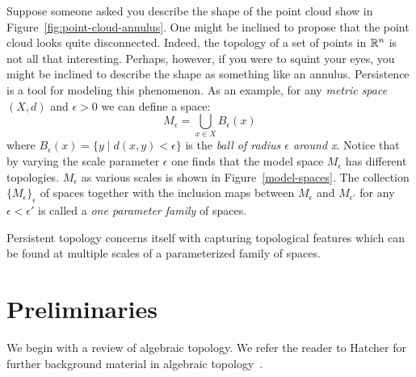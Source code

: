 Suppose someone asked you describe the shape of the point cloud show in Figure~\ref{fig:point-cloud-annulus}. One might be inclined to propose that the point cloud looks quite disconnected. Indeed, the topology of a set of points in $\mathbb{R}^n$ is not all that interesting. Perhaps, however, if you were to squint your eyes, you might be inclined to describe the shape as something like an annulus. Persistence is a tool for modeling this phenomenon. As an example, for any \emph{metric space} $(X,d)$ and  $\epsilon > 0$ we can define a space: \[ M_\epsilon = \bigcup_{x \in X} B_{\epsilon}(x) \] where $B_{\epsilon}(x) = \{ y \mid d(x,y) < \epsilon\} $ is the \emph{ball of radius $\epsilon$ around x}. Notice that by varying the scale parameter $\epsilon$ one finds that the model space $M_\epsilon$ has different topologies. $M_\epsilon$ as various scales is shown in Figure~\ref{model-spaces}. The collection $\{M_\epsilon\}_\epsilon$ of spaces together with the inclusion maps between $M_\epsilon$ and $M_{\epsilon'}$ for any $\epsilon < \epsilon'$ is called a \emph{one parameter family} of spaces.   
 
Persistent topology concerns itself with capturing topological features which can be found at multiple scales of a parameterized family of spaces.

\section{Preliminaries}
We begin with a review of algebraic topology. We refer the reader to Hatcher for further background material in algebraic topology~\cite{hatcher}.
